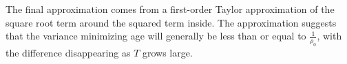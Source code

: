 \begin{frame}
	The final approximation comes from a first-order Taylor approximation of the square root term around the squared term inside. The approximation suggests that the variance minimizing age will generally be less than or equal to $\frac{1}{\rho_0}$, with the difference disappearing as $T$ grows large.
\end{frame}
